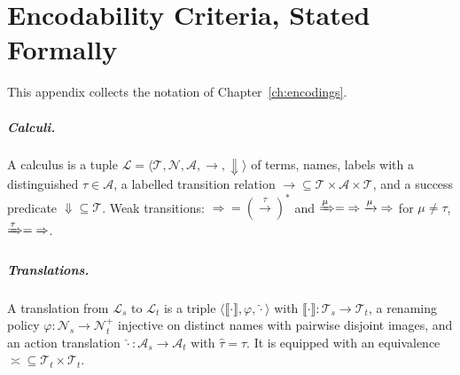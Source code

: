 \documentclass[11pt,openany]{book}
\theoremstyle{remark}
\begin{document}
\chapter{Encodability Criteria, Stated Formally}
\label{app:criteria}

This appendix collects the notation of Chapter~\ref{ch:encodings}.

\paragraph{Calculi.} A calculus is a tuple
$\mathcal L=\langle\mathcal T,\mathcal N,\mathcal A,\to,\Downarrow\rangle$
of terms, names, labels with a distinguished $\tau\in\mathcal A$, a
labelled transition relation ${\to}\subseteq\mathcal T\times\mathcal
A\times\mathcal T$, and a success predicate $\Downarrow\subseteq\mathcal
T$. Weak transitions: ${\Rightarrow}=(\xrightarrow{\tau})^{*}$ and
$\xRightarrow{\mu}={\Rightarrow}\xrightarrow{\mu}{\Rightarrow}$ for
$\mu\ne\tau$, $\xRightarrow{\tau}={\Rightarrow}$.

\paragraph{Translations.} A translation from $\mathcal L_s$ to
$\mathcal L_t$ is a triple $\langle\llbracket\cdot\rrbracket,\varphi,
\widehat{\cdot}\rangle$ with $\llbracket\cdot\rrbracket:\mathcal T_s\to
\mathcal T_t$, a renaming policy $\varphi:\mathcal N_s\to\mathcal N_t^{+}$
injective on distinct names with pairwise disjoint images, and an action
translation $\widehat{\cdot}:\mathcal A_s\to\mathcal A_t$ with
$\widehat\tau=\tau$. It is equipped with an equivalence
$\asymp\subseteq\mathcal T_t\times\mathcal T_t$.
\end{document}
